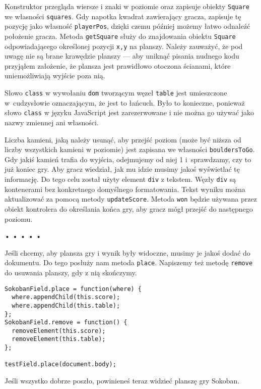 Konstruktor przegląda wiersze i znaki w poziomie oraz zapisuje obiekty \texttt{Square} we własności \texttt{squares}. Gdy napotka kwadrat zawierający gracza, zapisuje tę pozycję jako własność \texttt{playerPos}, dzięki czemu później możemy łatwo odnaleźć położenie gracza. Metoda \texttt{getSquare} służy do znajdowania obiektu \texttt{Square} odpowiadającego określonej pozycji \texttt{x,y} na planszy. Należy zauważyć, że pod uwagę nie są brane krawędzie planszy — aby uniknąć pisania nudnego kodu przyjąłem założenie, że plansza jest prawidłowo otoczona ścianami, które uniemożliwiają wyjście poza nią.

  
Słowo \texttt{class} w wywołaniu \texttt{dom} tworzącym węzeł \texttt{table} jest umieszczone w~cudzysłowie oznaczającym, że jest to łańcuch. Było to konieczne, ponieważ słowo \texttt{class} w języku JavaScript jest zarezerwowane i nie można go używać jako nazwy zmiennej ani własności.

  
Liczba kamieni, jaką należy usunąć, aby przejść poziom (może być niższa od liczby wszystkich kamieni w poziomie) jest zapisana we własności \texttt{bouldersToGo}. Gdy jakiś kamień trafia do wyjścia, odejmujemy od niej 1 i~sprawdzamy, czy to już koniec gry. Aby gracz wiedział, jak mu idzie musimy jakoś wyświetlać tę informację. Do tego celu został użyty element \texttt{div} z tekstem. Węzły \texttt{div} są kontenerami bez konkretnego domyślnego formatowania. Tekst wyniku można aktualizować za pomocą metody \texttt{updateScore}. Metoda \texttt{won} będzie używana przez obiekt kontrolera do określania końca gry, aby gracz mógł przejść do następnego poziomu.



\begin{center}
• • • • •
\end{center}

  
Jeśli chcemy, aby plansza gry i wynik były widoczne, musimy je jakoś dodać do dokumentu. Do tego posłuży nam metoda \texttt{place}. Napiszemy też metodę \texttt{remove} do usuwania planszy, gdy z nią skończymy.

  
\begin{verbatim} 
SokobanField.place = function(where) {
  where.appendChild(this.score);
  where.appendChild(this.table);
};
SokobanField.remove = function() {
  removeElement(this.score);
  removeElement(this.table);
};

testField.place(document.body);
 \end{verbatim}
  
Jeśli wszystko dobrze poszło, powinieneś teraz widzieć planszę gry Sokoban.



